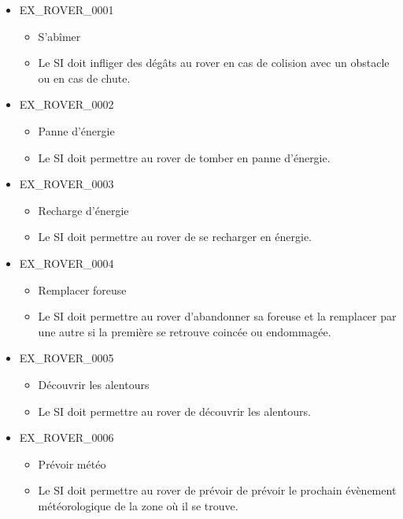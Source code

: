 \documentclass[12pt,a4paper]{scrartcl}
\begin{document}
\begin{itemize}

\item EX\_ROVER\_0001
\begin{itemize}
\item S'abîmer
\item Le SI doit infliger des dégâts au rover en cas de colision avec un obstacle ou en cas de chute.
\end{itemize}

\item EX\_ROVER\_0002
\begin{itemize}
\item Panne d'énergie
\item Le SI doit permettre au rover de tomber en panne d'énergie.
\end{itemize}

\item EX\_ROVER\_0003
\begin{itemize}
\item Recharge d'énergie
\item Le SI doit permettre au rover de se recharger en énergie.
\end{itemize}

\item EX\_ROVER\_0004
\begin{itemize}
\item Remplacer foreuse
\item Le SI doit permettre au rover d'abandonner sa foreuse et la remplacer par
		une autre si la première se retrouve coincée ou endommagée.
\end{itemize}

\item EX\_ROVER\_0005
\begin{itemize}
\item Découvrir les alentours
\item Le SI doit permettre au rover de découvrir les alentours.
\end{itemize}

\item EX\_ROVER\_0006
\begin{itemize}
\item Prévoir météo
\item Le SI doit permettre au rover de prévoir de prévoir le prochain évènement
		météorologique de la zone où il se trouve.
\end{itemize}

\end{itemize}
\end{document}
